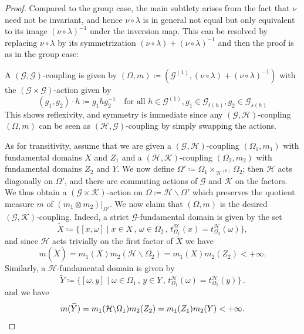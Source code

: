 \documentclass[11pt, oneside]{amsart}
\theoremstyle{definition}
\theoremstyle{remark}
\theoremstyle{TheoremNum}
\newcommand{\cG}{\mathcal{G}}
\newcommand{\cH}{\mathcal{H}}
\newcommand{\cK}{\mathcal{K}}
\begin{document}
\begin{proof} Compared to the group case, the main subtlety arises from the fact that $\nu$ need not be invariant, and hence  $\nu \circ \lambda$ is in general not equal but only equivalent to its image $(\nu\circ \lambda)^{-1}$ under the inversion map. This can be resolved by replacing $\nu \circ \lambda$ by its symmetrization $(\nu\circ \lambda) +(\nu\circ \lambda)^{-1}$ and then the proof is as in the group case:

A $(\cG, \cG)$-coupling is given by $(\Omega, m) \coloneqq (\mathcal{G}^{(1)},(\nu\circ \lambda) +(\nu\circ \lambda)^{-1})$ with the $(\cG \times \cG)$-action given by
\[
(g_1,g_2)\cdot  h \coloneqq g_1hg_2^{-1} \quad \text{for all }h\in \mathcal{G}^{(1)}, g_1 \in \mathcal{G}_{t(h)}, g_2\in \mathcal{G}_{s(h)}
\]
This shows reflexivity, and symmetry is immediate since any $(\mathcal{G},\mathcal{H})$-coupling $(\Omega,m)$ can be seen as $(\mathcal{H},\mathcal{G})$-coupling by simply swapping the actions. 

As for transitivity, assume that we are given a $(\mathcal{G},\mathcal{H})$-coupling $(\Omega_1,m_1)$ with fundamental domains $X$ and $Z_1$ and a $(\mathcal{H},\mathcal{K})$-coupling $(\Omega_2,m_2)$ with fundamental domains $Z_2$ and $Y$. We now define $\Omega' \coloneqq \Omega_1 \times_{\cH^{(0)}} \Omega_2$; then $\cH$ acts diagonally on $\Omega'$, and there are commuting actions of $\cG$ and $\cK$ on the factors. We thus obtain a $(\cG \times \cK)$-action on $\Omega \coloneqq \cH \backslash \Omega'$ which preserves the quotient measure $m$ of $(m_1 \otimes m_2)|_{\Omega'}$. We now claim that $(\Omega, m)$ is the desired $(\mathcal{G},\mathcal{K})$-coupling. 
Indeed, a strict $\mathcal{G}$-fundamental domain is given by the set 
$$\widetilde{X}\coloneqq \{ [x,\omega] \mid x\in X\,,\, \omega\in \Omega_2\,,\, t^{\mathcal{H}}_{\Omega_1}(x)=t^{\mathcal{H}}_{\Omega_2}(\omega) \},$$
and since $\mathcal{H}$ acts trivially on the first factor of $\widetilde{X}$ we have
$${m}(\widetilde{X})=m_1(X)m_2(\mathcal{H}\backslash \Omega_2)=m_1(X)m_2(Z_2)< +\infty.$$ 
Similarly, a $\mathcal{H}$-fundamental domain is given by
$$\widetilde{Y}\coloneqq \{ [\omega,y] \mid \omega \in \Omega_1\,,\, y\in Y \,,\, t^{\mathcal{H}}_{\Omega_1}(\omega)=t^{\mathcal{H}}_{\Omega_2}(y)\}\,.$$ 
and we have  \[m(\widetilde{Y})=m_1(\mathcal{H}\backslash\Omega_1)m_2(Z_2)=m_1(Z_1)m_2(Y) < +\infty .\qedhere\]
\end{proof}
\end{document}

